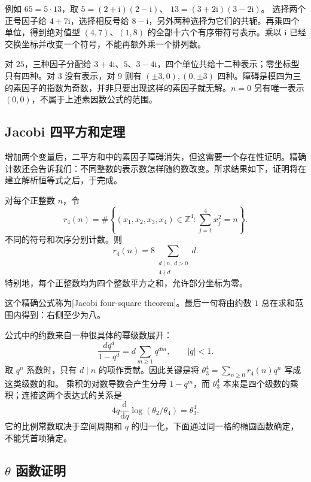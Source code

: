 例如 \(65=5\cdot13\)，取
\(5=(2+\mathrm{i})(2-\mathrm{i})\)、
\(13=(3+2\mathrm{i})(3-2\mathrm{i})\)。
选择两个正号因子给 \(4+7\mathrm{i}\)，选择相反号给 \(8-\mathrm{i}\)，另外两种选择为它们的共轭。再乘四个单位，得到绝对值型 \((4,7)\)、\((1,8)\) 的全部十六个有序带符号表示。乘以 \(\mathrm{i}\) 已经交换坐标并改变一个符号，不能再额外乘一个排列数。

对 \(25\)，三种因子分配给 \(3+4\mathrm{i}\)、\(5\)、\(3-4\mathrm{i}\)，四个单位共给十二种表示；零坐标型只有四种。对 \(3\) 没有表示，对 \(9\) 则有 \((\pm3,0),(0,\pm3)\) 四种。障碍是模四为三的素因子的指数为奇数，并非只要出现这样的素因子就无解。\(n=0\) 另有唯一表示 \((0,0)\)，不属于上述素因数公式的范围。

\subsection{Jacobi 四平方和定理}
\label{b3:subsec:240402}

增加两个变量后，二平方和中的素因子障碍消失，但这需要一个存在性证明。精确计数还会告诉我们：不同整数的表示数怎样随约数改变。所求结果如下，证明将在建立解析恒等式之后，于完成。

\begin{theorem}\label{b3:thm:24-four-squares}
对每个正整数 \(n\)，令
\[
r_4(n)=\#\left\{(x_1,x_2,x_3,x_4)\in\mathbb Z^4:
                    \sum_{j=1}^4x_j^2=n\right\}.
\]
不同的符号和次序分别计数。则
\[
r_4(n)=8\sum_{\substack{d\mid n,\ d>0\\4\nmid d}}d.
\]
特别地，每个正整数均为四个整数平方之和，允许部分坐标为零。
\end{theorem}
这个精确公式称为[Jacobi four-square theorem]。最后一句将由约数 \(1\) 总在求和范围内得到：右侧至少为八。

\ProseParagraphBreak
公式中的约数来自一种很具体的幂级数展开：
\[
\frac{dq^d}{1-q^d}=d\sum_{m\ge1}q^{dm},\qquad |q|<1.
\]
取 \(q^n\) 系数时，只有 \(d\mid n\) 的项作贡献。因此关键是将
\(\theta_3^4=\sum_{n\ge0}r_4(n)q^n\) 写成这类级数的和。
乘积的对数导数会产生分母 \(1-q^m\)，而 \(\theta_3^4\) 本来是四个级数的乘积；连接这两个表达式的关系是
\[
4q\frac{\mathrm d}{\mathrm dq}\log(\theta_2/\theta_4)=\theta_3^4.
\]
它的比例常数取决于空间周期和 \(q\) 的归一化，下面通过同一格的椭圆函数确定，不能凭首项猜定。

\subsection{\texorpdfstring{\(\theta\)}{\AnalysisPdfTheta} 函数证明}
\label{b3:subsec:240403}

